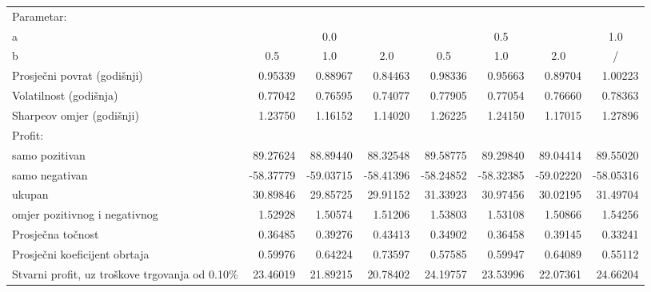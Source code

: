 \begin{sidewaystable}[p]
  \centering
  \label{table:results-1}
  \begin{tabularx}{\hsize}{Xrrrrrrr}
    \toprule
    Parametar: & & & & & & & \\
    \quad a & \multicolumn{3}{c}{0.0} & \multicolumn{3}{c}{0.5} & \multicolumn{1}{c}{1.0} \\ \cmidrule(lr){2-4} \cmidrule(lr){5-7} \cmidrule(lr){8-8}
    \quad b & \multicolumn{1}{c}{0.5} & \multicolumn{1}{c}{1.0} & \multicolumn{1}{c}{2.0} & \multicolumn{1}{c}{0.5} & \multicolumn{1}{c}{1.0} & \multicolumn{1}{c}{2.0} & \multicolumn{1}{c}{/} \\ \midrule
    Prosječni povrat (godišnji) & 0.95339 & 0.88967 & 0.84463 & 0.98336 & 0.95663 & 0.89704 & 1.00223 \\
    Volatilnost (godišnja) & 0.77042 & 0.76595 & 0.74077 & 0.77905 & 0.77054 & 0.76660 & 0.78363 \\
    Sharpeov omjer (godišnji) & 1.23750 & 1.16152 & 1.14020 & 1.26225 & 1.24150 & 1.17015 & 1.27896 \\ \midrule
    Profit: &  &  &  &  &  &  &  \\
    \quad samo pozitivan & 89.27624 & 88.89440 & 88.32548 & 89.58775 & 89.29840 & 89.04414 & 89.55020 \\
    \quad samo negativan & -58.37779 & -59.03715 & -58.41396 & -58.24852 & -58.32385 & -59.02220 & -58.05316 \\
    \quad ukupan & 30.89846 & 29.85725 & 29.91152 & 31.33923 & 30.97456 & 30.02195 & 31.49704 \\
    \quad omjer pozitivnog i negativnog & 1.52928 & 1.50574 & 1.51206 & 1.53803 & 1.53108 & 1.50866 & 1.54256 \\ \midrule
    Prosječna točnost & 0.36485 & 0.39276 & 0.43413 & 0.34902 & 0.36458 & 0.39145 & 0.33241 \\
    Prosječni koeficijent obrtaja & 0.59976 & 0.64224 & 0.73597 & 0.57585 & 0.59947 & 0.64089 & 0.55112 \\ \midrule
    Stvarni profit, uz troškove trgovanja od 0.10\% & 23.46019 & 21.89215 & 20.78402 & 24.19757 & 23.53996 & 22.07361 & 24.66204 \\
    \bottomrule
  \end{tabularx}
\end{sidewaystable}
